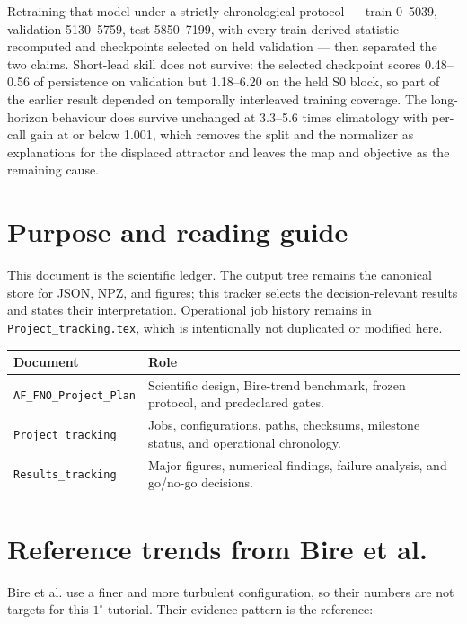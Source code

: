 \documentclass[11pt]{article}
\begin{document}
Retraining that model under a strictly chronological protocol --- train 0--5039,
validation 5130--5759, test 5850--7199, with every train-derived statistic
recomputed and checkpoints selected on held validation --- then separated the two
claims.  Short-lead skill does not survive: the selected checkpoint scores
0.48--0.56 of persistence on validation but 1.18--6.20 on the held S0 block, so
part of the earlier result depended on temporally interleaved training coverage.
The long-horizon behaviour does survive unchanged at 3.3--5.6 times climatology
with per-call gain at or below 1.001, which removes the split and the normalizer
as explanations for the displaced attractor and leaves the map and objective as
the remaining cause.
\par\endgroup

\section{Purpose and reading guide}

This document is the scientific ledger.  The output tree remains the canonical store
for JSON, NPZ, and figures; this tracker selects the decision-relevant results and states
their interpretation.  Operational job history remains in
\texttt{Project\_tracking.tex}, which is intentionally not duplicated or modified here.

\begin{tabularx}{\textwidth}{@{}p{}Y@{}}
\toprule
\textbf{Document} & \textbf{Role} \\
\midrule
\texttt{AF\_FNO\_Project\_Plan} & Scientific design, Bire-trend benchmark, frozen protocol, and predeclared gates. \\
\texttt{Project\_tracking} & Jobs, configurations, paths, checksums, milestone status, and operational chronology. \\
\texttt{Results\_tracking} & Major figures, numerical findings, failure analysis, and go/no-go decisions. \\
\bottomrule
\end{tabularx}

\section{Reference trends from Bire et al.}

Bire et al. use a finer and more turbulent configuration, so their numbers are not
targets for this $1^\circ$ tutorial.  Their evidence pattern is the reference:
\end{document}
